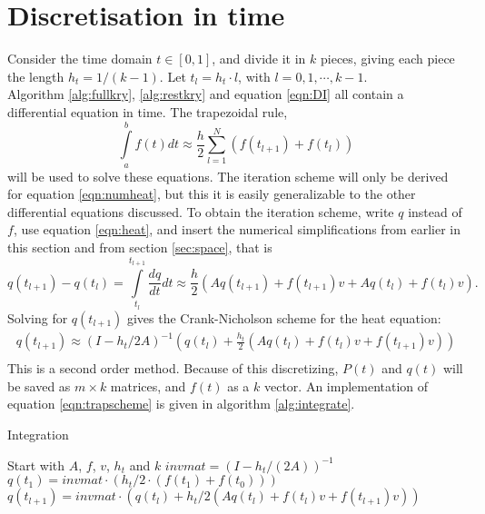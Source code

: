 \section{Discretisation in time} \label{sec:time}
Consider the time domain $t \in [0,1] $, and divide it in $k$ pieces, giving each piece the length $h_t = 1/(k-1)$. Let $t_l = h_t\cdot l$, with $l = 0,1,\cdots,k-1 $.\\

Algorithm \ref{alg:fullkry}, \ref{alg:restkry} and equation \ref{eqn:DI} all contain a differential equation in time.
The trapezoidal rule\cite{trap}, 
\begin{equation} \label{eqn:trap}
\int \limits_a^b f(t) dt \approx \frac{h}{2} \sum \limits_{l = 1}^N(f(t_{l+1})+f(t_l))
\end{equation}
will be used to solve these equations. 
The iteration scheme will only be derived for equation \eqref{eqn:numheat}, but 
this it is easily generalizable to the other differential equations discussed.
To obtain the iteration scheme, write $q$ instead of $f$, use equation \eqref{eqn:heat}, and insert the numerical simplifications from earlier in this section and from section \ref{sec:space}, that is
\begin{equation}
q(t_{l+1}) - q(t_l) = \int \limits_{t_l}^{t_{l+1}} \frac{d q}{d t} dt \approx \frac{h}{2}(A q(t_{l+1})+f(t_{l+1})v +A q(t_l)+f(t_l) v) .
\end{equation}
Solving for $q(t_{l+1})$ gives the Crank-Nicholson scheme for the heat equation:
\begin{equation} \label{eqn:trapscheme}
\begin{aligned}
q(t_{l+1}) \approx (I-h_t/2 A)^{-1}(q(t_l) + \frac{h_t}{2}( A q(t_{l}) + f(t_l)v+f(t_{l+1})v))\\
\end{aligned}
\end{equation} 
This is a second order method.
Because of this discretizing, $P(t)$ and $q(t)$ will be saved as $m \times k $ matrices, and $f(t)$ as a $k$ vector. An implementation of equation \eqref{eqn:trapscheme} is given in algorithm \ref{alg:integrate}.
\begin{algorithm} 
\begin{algorithmic} \caption{Integration} \label{alg:integrate}  
\STATE Start with $A$, $f$, $v$, $h_t$ and $k$
\STATE $invmat = (I-h_t/(2A))^{-1}$
\STATE $q(t_1) = invmat \cdot (h_t/2 \cdot (f(t_1)+f(t_0)))$
\STATE $q(t_{l+1}) = invmat \cdot (q(t_l) + h_t/2( A q(t_{l}) + f(t_l)v+f(t_{l+1})v))$
\ENDFOR
\end{algorithmic} 
\end{algorithm}

